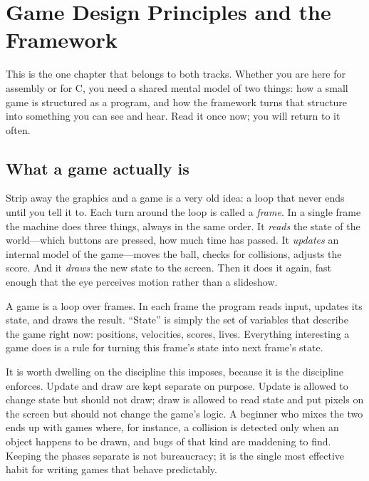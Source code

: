 \chapter{Game Design Principles and the \prg Framework}
\label{ch:platform}

This is the one chapter that belongs to both tracks. Whether you are here for
assembly or for C, you need a shared mental model of two things: how a small game
is structured as a program, and how the \prg framework turns that structure into
something you can see and hear. Read it once now; you will return to it often.

\section{What a game actually is}

Strip away the graphics and a game is a very old idea: a loop that never ends
until you tell it to. Each turn around the loop is called a \emph{frame}. In a
single frame the machine does three things, always in the same order. It
\emph{reads} the state of the world---which buttons are pressed, how much time has
passed. It \emph{updates} an internal model of the game---moves the ball, checks
for collisions, adjusts the score. And it \emph{draws} the new state to the
screen. Then it does it again, fast enough that the eye perceives motion rather
than a slideshow.

\begin{prgconcept}
A game is a loop over frames. In each frame the program reads input, updates its
state, and draws the result. ``State'' is simply the set of variables that
describe the game right now: positions, velocities, scores, lives. Everything
interesting a game does is a rule for turning this frame's state into next
frame's state.
\end{prgconcept}

It is worth dwelling on the discipline this imposes, because it is the discipline
\prg enforces. Update and draw are kept separate on purpose. Update is allowed to
change state but should not draw; draw is allowed to read state and put pixels on
the screen but should not change the game's logic. A beginner who mixes the two
ends up with games where, for instance, a collision is detected only when an
object happens to be drawn, and bugs of that kind are maddening to find. Keeping
the phases separate is not bureaucracy; it is the single most effective habit for
writing games that behave predictably.

